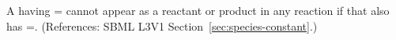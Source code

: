 A \Species having = cannot
appear as a reactant or product in any reaction if that \Species
also has =.  (References: SBML
L3V1 Section~\ref{sec:species-constant}.)
